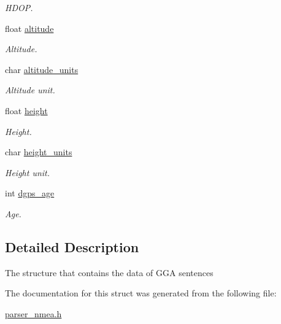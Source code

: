 \begin{DoxyCompactItemize}
\begin{DoxyCompactList}\small\item\em H\+D\+OP. \end{DoxyCompactList}\item 
float \hyperlink{structnmea__sentence__gga_a0e13a4b4ae0cefdac2a413284239caa6}{altitude}\hypertarget{structnmea__sentence__gga_a0e13a4b4ae0cefdac2a413284239caa6}{}\label{structnmea__sentence__gga_a0e13a4b4ae0cefdac2a413284239caa6}

\begin{DoxyCompactList}\small\item\em Altitude. \end{DoxyCompactList}\item 
char \hyperlink{structnmea__sentence__gga_a7166b52e8913d6d4dd40e8c161954552}{altitude\+\_\+units}\hypertarget{structnmea__sentence__gga_a7166b52e8913d6d4dd40e8c161954552}{}\label{structnmea__sentence__gga_a7166b52e8913d6d4dd40e8c161954552}

\begin{DoxyCompactList}\small\item\em Altitude unit. \end{DoxyCompactList}\item 
float \hyperlink{structnmea__sentence__gga_a48083b65ac9a863566dc3e3fff09a5b4}{height}\hypertarget{structnmea__sentence__gga_a48083b65ac9a863566dc3e3fff09a5b4}{}\label{structnmea__sentence__gga_a48083b65ac9a863566dc3e3fff09a5b4}

\begin{DoxyCompactList}\small\item\em Height. \end{DoxyCompactList}\item 
char \hyperlink{structnmea__sentence__gga_abe8e77aaa06b9f9485259ede3bd47148}{height\+\_\+units}\hypertarget{structnmea__sentence__gga_abe8e77aaa06b9f9485259ede3bd47148}{}\label{structnmea__sentence__gga_abe8e77aaa06b9f9485259ede3bd47148}

\begin{DoxyCompactList}\small\item\em Height unit. \end{DoxyCompactList}\item 
int \hyperlink{structnmea__sentence__gga_afb452cdc55614cf7fe9630b9e7e1c412}{dgps\+\_\+age}\hypertarget{structnmea__sentence__gga_afb452cdc55614cf7fe9630b9e7e1c412}{}\label{structnmea__sentence__gga_afb452cdc55614cf7fe9630b9e7e1c412}

\begin{DoxyCompactList}\small\item\em Age. \end{DoxyCompactList}\end{DoxyCompactItemize}


\subsection{Detailed Description}
The structure that contains the data of G\+GA sentences 

The documentation for this struct was generated from the following file\+:\begin{DoxyCompactItemize}
\item 
\hyperlink{parser__nmea_8h}{parser\+\_\+nmea.\+h}\end{DoxyCompactItemize}
